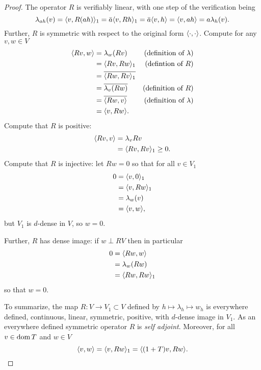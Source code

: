 \documentclass[11pt]{amsart}
\begin{document}
\begin{proof}
			The operator $R$ is verifiably linear, with one step of the verification being
			\begin{equation*}
				\lambda_{ah}(v)=\langle v, R(ah) \rangle_1=\bar{a}\langle v, Rh \rangle_1=\bar{a}\langle v, h \rangle=\langle v, ah \rangle=a\lambda_h(v).
			\end{equation*}	
		Further, $R$ is symmetric with respect to the original form $\langle \cdot, \cdot \rangle$. Compute for any $v,w \in V$
			\begin{align*}
				\langle Rv, w \rangle& =\lambda_w (Rv)  & (\text{definition of $\lambda$}) \\
					        & = \langle Rv, Rw \rangle_1 &(\text{defintion of $R$})\\
					        & = \overline{\langle Rw, Rv \rangle_1} &\\
					        & = \overline{\lambda_v(Rw)} &(\text{definition of $R$})\\
					        & = \overline{\langle Rw, v \rangle} &(\text{definition of $\lambda$})\\ 
					        & = \langle v, Rw \rangle.
			\end{align*}
		Compute that $R$ is positive:
			\begin{align*}
				\langle Rv, v \rangle & =\lambda_v {Rv} \\
				                & = \langle Rv, Rv \rangle_1 \geq 0.
			\end{align*}
		Compute that $R$ is injective: let $Rw=0$ so that for all $v\in V_1$
			\begin{align*}
				0 &=\langle v, 0 \rangle_1 \\
				   &=\langle v, Rw \rangle_1 \\
				   &=\lambda_w (v) \\
				   &= \langle v, w \rangle,
			\end{align*}
		but $V_1$ is $d$-dense in $V$, so $w=0$. 
		
		Further, $R$ has dense image: if $w \perp RV$ then in particular
			\begin{align*}
				0&=\langle Rw, w \rangle \\
				  &=\lambda_w(Rw) \\
				  &=\langle Rw, Rw \rangle_1
			\end{align*}
		so that $w=0$. 
		
		
		To summarize, the map $R:V\to V_1\subset V$ defined by $h\mapsto \lambda_h\mapsto w_h$ is everywhere defined, continuous, linear, symmetric, positive, with $d$-dense image in $V_1$. As an everywhere defined symmetric operator $R$ is \emph{self adjoint}. Moreover, for all $v\in \operatorname{dom} T$ and $w\in V$
			\begin{equation*}
				\langle v, w \rangle=\langle v, Rw \rangle_1=\langle (1+T)v, Rw \rangle.
			\end{equation*}
		

\end{proof}
\end{document}
